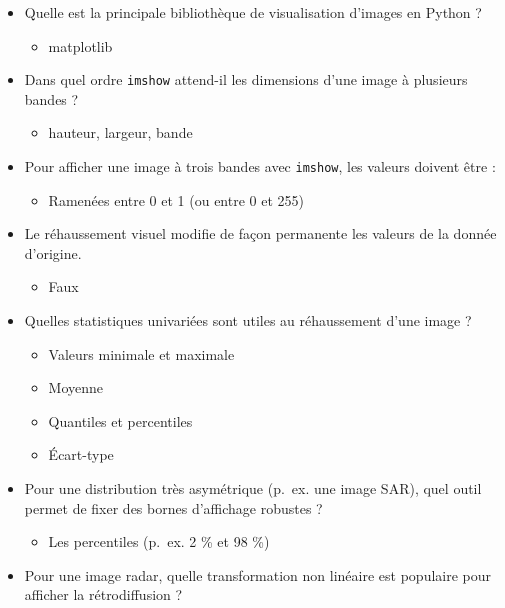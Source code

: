 \documentclass[
  french,
  11pt,
  letterpaper,
  open=any,
  twoside=false,
  french]{scrbook}
\providecommand{\tightlist}{%
  \setlength{\itemsep}{0pt}\setlength{\parskip}{0pt}}
\begin{document}
\begin{itemize}
\tightlist
\item
  Quelle est la principale bibliothèque de visualisation d'images en
  Python ?

  \begin{itemize}
  \tightlist
  \item
    matplotlib
  \end{itemize}
\item
  Dans quel ordre \texttt{imshow} attend-il les dimensions d'une image à
  plusieurs bandes ?

  \begin{itemize}
  \tightlist
  \item
    hauteur, largeur, bande
  \end{itemize}
\item
  Pour afficher une image à trois bandes avec \texttt{imshow}, les
  valeurs doivent être :

  \begin{itemize}
  \tightlist
  \item
    Ramenées entre 0 et 1 (ou entre 0 et 255)
  \end{itemize}
\item
  Le réhaussement visuel modifie de façon permanente les valeurs de la
  donnée d'origine.

  \begin{itemize}
  \tightlist
  \item
    Faux
  \end{itemize}
\item
  Quelles statistiques univariées sont utiles au réhaussement d'une
  image ?

  \begin{itemize}
  \tightlist
  \item
    Valeurs minimale et maximale
  \item
    Moyenne
  \item
    Quantiles et percentiles
  \item
    Écart-type
  \end{itemize}
\item
  Pour une distribution très asymétrique (p.~ex. une image SAR), quel
  outil permet de fixer des bornes d'affichage robustes ?

  \begin{itemize}
  \tightlist
  \item
    Les percentiles (p.~ex. 2 \% et 98 \%)
  \end{itemize}
\item
  Pour une image radar, quelle transformation non linéaire est populaire
  pour afficher la rétrodiffusion ?


\end{itemize}
\end{document}
